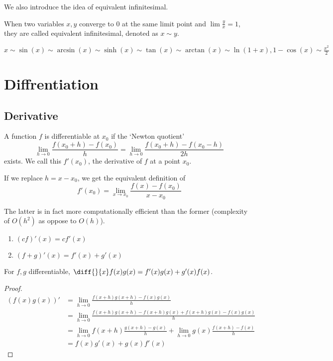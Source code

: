 \documentclass[11pt]{article}
\begin{document}
We also introduce the idea of equivalent infinitesimal.
\begin{definition}
  When two variables \(x,y\) converge to \(0\) at the same limit point and \(\lim\frac{y}{x}=1\), they are called equivalent infinitesimal, denoted as \(x \sim y\).
\end{definition}
\begin{proposition}
  \(x \sim \sin(x) \sim \arcsin(x) \sim \sinh(x) \sim \tan(x) \sim \arctan(x) \sim \ln(1+x), 1-\cos(x) \sim \frac{x^2}{2}\)
\end{proposition}

\section{Diffrentiation}
\subsection{Derivative}
\begin{definition}[Differentiability]
  A function \(f\) is differentiable at \(x_0\) if the `Newton quotient'
  \begin{equation*}
    \lim_{h\to 0}\frac{f(x_0+h)-f(x_0)}{h} = \lim_{h\to 0}\frac{f(x_0+h)-f(x_0-h)}{2h}
  \end{equation*}
  exists. We call this \(f'(x_0)\), the derivative of \(f\) at a point \(x_0\).
  
  If we replace \(h=x-x_0\), we get the equivalent definition of 
  \[f'(x_0)=\lim_{x\to x_0}\frac{f(x)-f(x_0)}{x-x_0}\]
\end{definition}

The latter is in fact more computationally efficient than the former (complexity of \(O(h^2)\) as oppose to \(O(h)\)).

\begin{proposition}
  \begin{enumerate}
    \item \((cf)'(x)=cf'(x)\)
    \item \((f+g)'(x)=f'(x)+g'(x)\)
  \end{enumerate}
\end{proposition}

\begin{proposition}
  For \(f,g\) differentiable, \(\diff{}{x}f(x)g(x)=f'(x)g(x)+g'(x)f(x)\).
\end{proposition}
\begin{proof}
  \begin{align*}
    (f(x)g(x))' &= \lim_{h\to 0}\frac{f(x+h)g(x+h)-f(x)g(x)}{h} \\
    &= \lim_{h\to 0}\frac{f(x+h)g(x+h)-f(x+h)g(x)+f(x+h)g(x)-f(x)g(x)}{h} \\
    &= \lim_{h\to 0}f(x+h)\frac{g(x+h)-g(x)}{h} + \lim_{h\to 0}g(x)\frac{f(x+h)-f(x)}{h} \\
    &=f(x)g'(x)+g(x)f'(x)
  \end{align*}
\end{proof}
\end{document}
